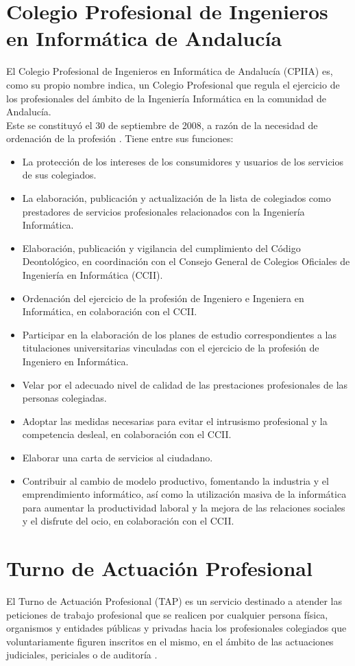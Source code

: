 \section{Colegio Profesional de Ingenieros en Informática de Andalucía}
El Colegio Profesional de Ingenieros en Informática de Andalucía (CPIIA) es, como su propio nombre indica, un Colegio Profesional que regula el ejercicio de los profesionales del ámbito de la Ingeniería Informática en la comunidad de Andalucía. \\

Este se constituyó el 30 de septiembre de 2008, a razón de la necesidad de ordenación de la profesión \cite{cpiia}. Tiene entre sus funciones:
\begin{itemize}
\item La protección de los intereses de los consumidores y usuarios de los servicios de sus colegiados.
\item La elaboración, publicación y actualización de la lista de colegiados como prestadores de servicios profesionales relacionados con la Ingeniería Informática.
\item Elaboración, publicación y vigilancia del cumplimiento del Código Deontológico, en coordinación con el Consejo General de Colegios Oficiales de Ingeniería en Informática (CCII).
\item Ordenación del ejercicio de la profesión de Ingeniero e Ingeniera en Informática, en colaboración con el CCII.
\item Participar en la elaboración de los planes de estudio correspondientes a las titulaciones universitarias vinculadas con el ejercicio de la profesión de Ingeniero en Informática.
\item Velar por el adecuado nivel de calidad de las prestaciones profesionales de las personas colegiadas.
\item Adoptar las medidas necesarias para evitar el intrusismo profesional y la competencia desleal, en colaboración con el CCII.
\item Elaborar una carta de servicios al ciudadano.
\item Contribuir al cambio de modelo productivo, fomentando la industria y el emprendimiento informático, así como la utilización masiva de la informática para aumentar la productividad laboral y la mejora de las relaciones sociales y el disfrute del ocio, en colaboración con el CCII.
\end{itemize}


\section{Turno de Actuación Profesional}
El Turno de Actuación Profesional (TAP) es un servicio destinado a atender las peticiones de trabajo profesional que se realicen por cualquier persona física, organismos y entidades públicas y privadas hacia los profesionales colegiados que voluntariamente figuren inscritos en el mismo, en el ámbito de las actuaciones judiciales, periciales o de auditoría \cite{tapecoourense}. \\


